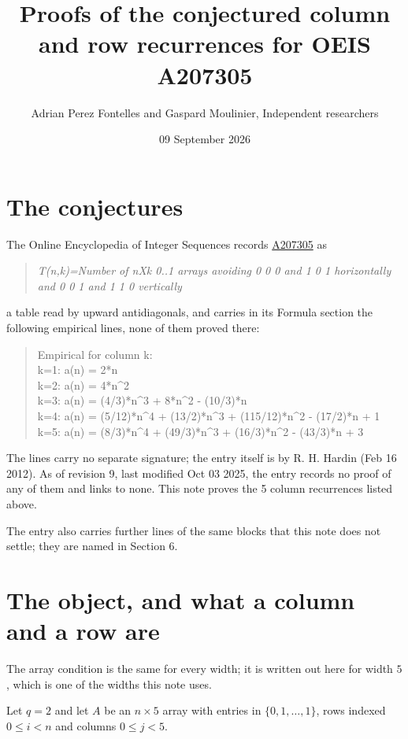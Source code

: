 \documentclass[11pt]{article}
\title{Proofs of the conjectured column and row recurrences for OEIS A207305}
\author{Adrian Perez Fontelles and Gaspard Moulinier, Independent researchers}
\date{09 September 2026}
\theoremstyle{definition}
\begin{document}
\maketitle
\section{The conjectures}

The Online Encyclopedia of Integer Sequences records \href{https://oeis.org/A207305}{A207305} as

\begin{quote}\itshape T(n,k)=Number of nXk 0..1 arrays avoiding 0 0 0 and 1 0 1 horizontally and 0 0 1 and 1 1 0 vertically\end{quote}

a table read by upward antidiagonals, and carries in its Formula section the following empirical lines, none of them proved there:

\begin{quote}\ttfamily Empirical for column k:\\
k=1: a(n) = 2*n\\k=2: a(n) = 4*n\textasciicircum{}2\\k=3: a(n) = (4/3)*n\textasciicircum{}3 + 8*n\textasciicircum{}2 - (10/3)*n\\k=4: a(n) = (5/12)*n\textasciicircum{}4 + (13/2)*n\textasciicircum{}3 + (115/12)*n\textasciicircum{}2 - (17/2)*n + 1\\k=5: a(n) = (8/3)*n\textasciicircum{}4 + (49/3)*n\textasciicircum{}3 + (16/3)*n\textasciicircum{}2 - (43/3)*n + 3\end{quote}

The lines carry no separate signature; the entry itself is by R. H. Hardin (Feb 16 2012). As of revision 9, last modified Oct 03 2025, the entry records no proof of any of them and links to none. This note proves the 5 column recurrences listed above.

The entry also carries further lines of the same blocks that this note does not settle; they are named in Section 6.

\section{The object, and what a column and a row are}

The array condition is the same for every width; it is written out here for width $5$, which is one of the widths this note uses.

Let $q = 2$ and let $A$ be an $n \times 5$ array with entries in $\{0,1,\dots,1\}$, rows indexed $0 \le i < n$ and columns $0 \le j < 5$.
\end{document}
